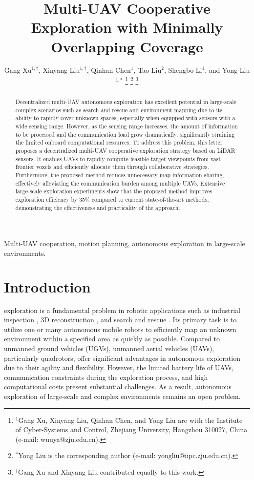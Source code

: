 \documentclass[letterpaper, 10pt, journal, twoside]{support/IEEEtran}
\title{Multi-UAV Cooperative Exploration with Minimally Overlapping Coverage}
\author{Gang Xu$^{1, \dagger}$, Xinyang Liu$^{1, \dagger}$, Qinhan Chen$^{1}$, Tao Liu$^{2}$, Shengbo Li$^{1}$, and Yong Liu$^{1,*}$%
\thanks{$^{1}$Gang Xu, Xinyang Liu, Qinhan Chen, and Yong Liu are with the Institute of Cyber-Systems and Control, Zhejiang University, Hangzhou 310027, China (e-mail: wuuya@zju.edu.cn).}%
\thanks{$^{*}$Yong Liu is the corresponding author (e-mail: yongliu@iipc.zju.edu.cn).}
\thanks{$^{\dagger}$Gang Xu and Xinyang Liu contributed equally to this work.} %
}
\begin{document}
\maketitle
\begin{abstract}
Decentralized multi-UAV autonomous exploration has excellent potential in large-scale complex scenarios such as search and rescue and environment mapping due to its ability to rapidly cover unknown spaces, especially when equipped with sensors with a wide sensing range. However, as the sensing range increases, the amount of information to be processed and the communication load grow dramatically, significantly straining the limited onboard computational resources. To address this problem, this letter proposes a decentralized multi-UAV cooperative exploration strategy based on LiDAR sensors. It enables UAVs to rapidly compute feasible target viewpoints from vast frontier voxels and efficiently allocate them through collaborative strategies. Furthermore, the proposed method reduces unnecessary map information sharing, effectively alleviating the communication burden among multiple UAVs. Extensive large-scale exploration experiments show that the proposed method improves exploration efficiency by 35\% compared to current state-of-the-art methods, demonstrating the effectiveness and practicality of the approach.
\end{abstract}

\vspace{-0.28cm}
\begin{IEEEkeywords}
Multi-UAV cooperation, motion planning, autonomous exploration in large-scale environments.
\end{IEEEkeywords}

\section{Introduction}
\label{sec:intro}

 exploration is a fundamental problem in robotic applications such as industrial inspection \cite{ yoder2016autonomous, bircher2018receding, gao2023uav}, 3D reconstruction \cite{hepp2018plan3d, yan2021sampling, zhang2024soar}, and search and rescue \cite{erdelj2017help, schedl2021autonomous, zhang2022fast}. Its primary task is to utilize one or many autonomous mobile robots to efficiently map an unknown environment within a specified area as quickly as possible. Compared to unmanned ground vehicles (UGVs), unmanned aerial vehicles (UAVs), particularly quadrotors, offer significant advantages in autonomous exploration due to their agility and flexibility. However, the limited battery life of UAVs, communication constraints during the exploration process, and high computational costs present substantial challenges. As a result, autonomous exploration of large-scale and complex environments remains an open problem.
\end{document}
